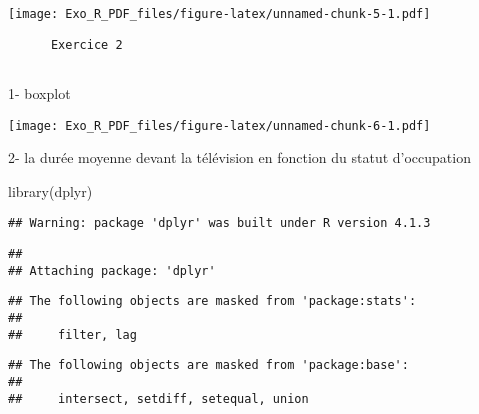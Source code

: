 \documentclass[
]{article}
\newenvironment{Shaded}{\begin{snugshade}}{\end{snugshade}}
\newcommand{\AttributeTok}[1]{\textcolor[rgb]{0.77,0.63,0.00}{#1}}
\newcommand{\FunctionTok}[1]{\textcolor[rgb]{0.00,0.00,0.00}{#1}}
\newcommand{\NormalTok}[1]{#1}
\newcommand{\SpecialCharTok}[1]{\textcolor[rgb]{0.00,0.00,0.00}{#1}}
\newcommand{\StringTok}[1]{\textcolor[rgb]{0.31,0.60,0.02}{#1}}
\begin{document}
\texttt{[image: Exo\_R\_PDF\_files/figure-latex/unnamed-chunk-5-1.pdf]}

\begin{verbatim}
      Exercice 2
      
\end{verbatim}

1- boxplot

\begin{Shaded}
\end{Shaded}

\texttt{[image: Exo\_R\_PDF\_files/figure-latex/unnamed-chunk-6-1.pdf]}

2- la durée moyenne devant la télévision en fonction du statut
d'occupation

\begin{Shaded}
\begin{Highlighting}[]
\FunctionTok{library}\NormalTok{(dplyr)}
\end{Highlighting}
\end{Shaded}

\begin{verbatim}
## Warning: package 'dplyr' was built under R version 4.1.3
\end{verbatim}

\begin{verbatim}
## 
## Attaching package: 'dplyr'
\end{verbatim}

\begin{verbatim}
## The following objects are masked from 'package:stats':
## 
##     filter, lag
\end{verbatim}

\begin{verbatim}
## The following objects are masked from 'package:base':
## 
##     intersect, setdiff, setequal, union
\end{verbatim}

\begin{Shaded}
\end{Shaded}
\end{document}
